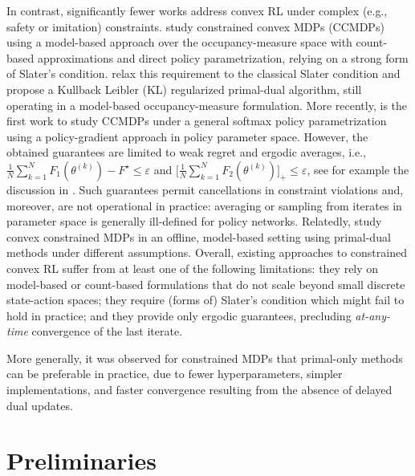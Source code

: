\documentclass{article}
\theoremstyle{plain}
\theoremstyle{definition}
\theoremstyle{remark}
\begin{document}
In contrast, significantly fewer works address convex RL under complex
(e.g., safety or imitation) constraints.
\citet{agarwalConcaveUtilityReinforcement2022a} study constrained convex
MDPs (CCMDPs) using a model-based approach over the occupancy-measure space
with count-based approximations and direct policy parametrization, relying
on a strong form of Slater's condition.
\citet{baiAchievingZeroConstraint2023a} relax this requirement to the
classical Slater condition and propose a Kullback Leibler (KL) regularized
primal-dual algorithm, still operating in a model-based occupancy-measure
formulation. More recently, \cite{yingPolicybasedPrimalDualMethods2025} is
the first work to study CCMDPs under a general softmax policy
parametrization using a policy-gradient approach in policy parameter space.
However, the obtained guarantees are limited to weak regret and ergodic
averages, i.e., $\frac{1}{N}\sum_{k=1}^{N} F_1(\theta^{(k)}) - F^\star \le
 \varepsilon$ and $\bigl[\frac{1}{N}\sum_{k=1}^{N} F_2(\theta^{(k)})\bigr]_+
 \le \varepsilon$, see for example the discussion in
\cite{mullerTrulyNoRegretLearning2024}. Such guarantees permit
cancellations in constraint violations and, moreover, are not operational
in practice: averaging or sampling from iterates in parameter space is
generally ill-defined for policy networks. Relatedly,
\citet{zhangSafeEfficientPrimalDual2024} study convex constrained MDPs in
an offline, model-based setting using primal-dual methods under different
assumptions. Overall, existing approaches to constrained convex RL suffer
from at least one of the following limitations: they rely on model-based or
count-based formulations that do not scale beyond small discrete
state-action spaces; they require (forms of) Slater's condition which might
fail to hold in practice; and they provide only ergodic guarantees,
precluding \emph{at-any-time} convergence of the last iterate.

More generally, it was observed for constrained MDPs
\cite{xuCRPONewApproach2021,islamovSafeEFErrorFeedback2025} that
primal-only methods can be preferable in practice, due to fewer
hyperparameters, simpler implementations, and faster convergence resulting
from the absence of delayed dual updates.

\section{Preliminaries}
\end{document}

